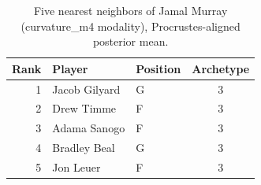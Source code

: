 \begin{table}[htbp]
  \centering\small
  \begin{tabular}{rllc}
    \toprule
    Rank & Player & Position & Archetype \\
    \midrule
    1 & Jacob Gilyard & G & 3 \\
    2 & Drew Timme & F & 3 \\
    3 & Adama Sanogo & F & 3 \\
    4 & Bradley Beal & G & 3 \\
    5 & Jon Leuer & F & 3 \\
    \bottomrule
  \end{tabular}
  \caption{Five nearest neighbors of Jamal Murray (curvature_m4 modality), Procrustes-aligned posterior mean.}
  \label{tab:Jamal_Murray_neighbors_curvature_m4}
\end{table}


